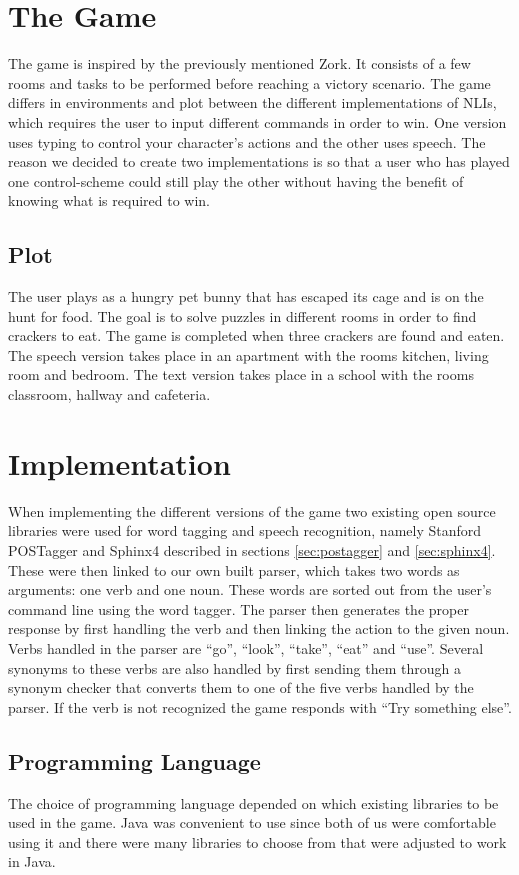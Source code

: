 \section{The Game}
The game is inspired by the previously mentioned Zork. It consists of a few rooms and tasks to be performed before reaching a victory scenario. The game differs in environments and plot between the different implementations of NLIs, which requires the user to input different commands in order to win. One version uses typing to control your character’s actions and the other uses speech. The reason we decided to create two implementations is so that a user who has played one control-scheme could still play the other without having the benefit of knowing what is required to win.

\subsection{Plot}
The user plays as a hungry pet bunny that has escaped its cage and is on the hunt for food. The goal is to solve puzzles in different rooms in order to find crackers to eat. The game is completed when three crackers are found and eaten. The speech version takes place in an apartment with the rooms kitchen, living room and bedroom. The text version takes place in a school with the rooms classroom, hallway and cafeteria.

\section{Implementation}
When implementing the different versions of the game two existing open source libraries were used for word tagging and speech recognition, namely Stanford POSTagger and Sphinx4 described in sections \ref{sec:postagger} and \ref{sec:sphinx4}. These were then linked to our own built parser, which takes two words as arguments: one verb and one noun. These words are sorted out from the user's command line using the word tagger. The parser then generates the proper response by first handling the verb and then linking the action to the given noun. Verbs handled in the parser are ``go'', ``look'', ``take'', ``eat'' and ``use''. Several synonyms to these verbs are also handled by first sending them through a synonym checker that converts them to one of the five verbs handled by the parser. If the verb is not recognized the game responds with ``Try something else''.

\subsection{Programming Language}
The choice of programming language depended on which existing libraries to be used in the game. Java was convenient to use since both of us were comfortable using it and there were many libraries to choose from that were adjusted to work in Java.

